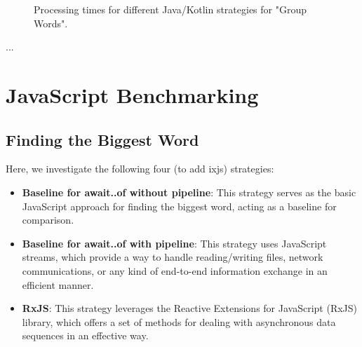     \begin{figure}[H]
        \centering
        \caption{Processing times for different Java/Kotlin strategies for "Group Words".}
        \label{fig:processing_times}
    \end{figure}
    

    \clearpage
... 


\section{JavaScript Benchmarking}
\label{sec:js_implementation}


\subsection{Finding the Biggest Word}
\label{subsec:biggest_word_js}

Here, we investigate the following four (to add ixjs) strategies:

\begin{itemize}
    \item \textbf{Baseline for await..of without pipeline}: This strategy serves as the basic JavaScript approach for finding the biggest word, acting as a baseline for comparison.
    \item \textbf{Baseline for await..of with pipeline}: This strategy uses JavaScript streams, which provide a way to handle reading/writing files, network communications, or any kind of end-to-end information exchange in an efficient manner.
    \item \textbf{RxJS}: This strategy leverages the Reactive Extensions for JavaScript (RxJS) library, which offers a set of methods for dealing with asynchronous data sequences in an effective way.
\end{itemize}


